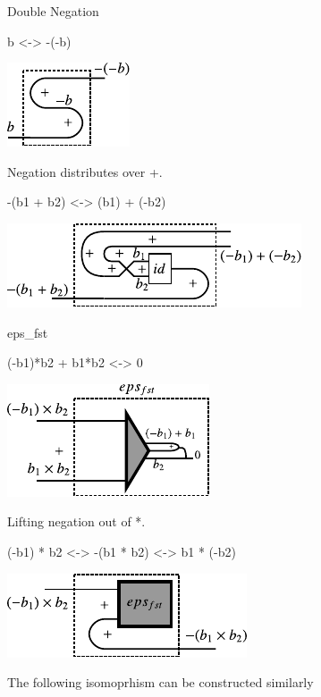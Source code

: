 \documentclass[preprint]{sigplanconf}
\begin{document}
Double Negation

{{b <-> -(-b)}}

\begin{center}
  \includegraphics{diagrams/double_neg.pdf}
\end{center}

Negation distributes over {{+}}.

{{-(b1 + b2) <-> (b1) + (-b2)}}

\begin{center}
  \includegraphics{diagrams/dist_neg_plus.pdf}
\end{center}

{{eps_{fst} }}

{{(-b1)*b2 + b1*b2 <-> 0}}

\begin{center}
  \includegraphics{diagrams/eps_fst.pdf}
\end{center}

Lifting negation out of {{*}}.

{{(-b1) * b2 <-> -(b1 * b2) <-> b1 * (-b2)}}

\begin{center}
  \includegraphics{diagrams/mult_neg.pdf}
\end{center}

The following isomoprhism can be constructed similarly 
\end{document}
